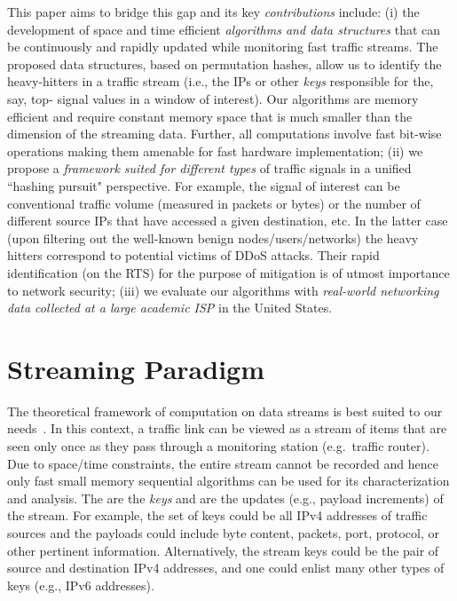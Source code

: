 \documentclass[10pt, conference, letterpaper,onecolumn]{IEEEtranv1.8}
\theoremstyle{plain}\newtheorem{thm}{Theorem}\newtheorem{lem}{Lemma}
\theoremstyle{definition}
\begin{document}
This paper aims to bridge this gap and its key {\em contributions} include:
(i) the  development of space and time efficient \emph{algorithms  and data structures} that can be continuously 
and rapidly updated while monitoring fast traffic streams. The proposed data structures, based on permutation hashes, allow us to identify the
heavy-hitters in a traffic stream (i.e., the IPs or other \emph{keys} responsible for the, say, top- signal values in a window of interest).
Our algorithms are
memory efficient and require constant memory space that is much smaller than the 
dimension of the streaming data. Further, all computations
involve fast bit-wise  operations making them amenable for fast hardware implementation;
(ii) we propose a \emph{framework  suited for different types} of traffic signals in a unified ``hashing pursuit" perspective. For example, the signal of interest can be 
conventional traffic volume (measured in packets or bytes) or the number of different source IPs  that have accessed a given destination, etc. In 
the latter case (upon filtering out the well-known benign nodes/users/networks) the heavy hitters correspond to potential victims of DDoS attacks. Their rapid
identification (on the RTS) for the purpose of mitigation is of utmost importance to network security; (iii) we evaluate our algorithms with
\emph{real-world networking data collected at a large academic ISP} in the United States.  
 
\section{Streaming Paradigm}
\label{sec:streaming}

The theoretical framework of computation on data streams is best suited to our needs~\cite{Muthukrishnan:2005:DSA:1166409.1166410}. In this context,
a traffic link can be viewed as a stream of items  that are seen only once
as they pass through a monitoring station (e.g.\ traffic router). Due to space/time constraints, the 
entire stream cannot be recorded and hence only fast small memory sequential algorithms can be used 
for its characterization and analysis. The  are the {\em keys} and  are the updates 
(e.g., payload increments) of the stream. For example, the set of keys  could be all IPv4 addresses of
traffic sources and the payloads could include byte content, packets, port, protocol,
or other pertinent information. Alternatively, the stream keys  could be the pair of
source and destination IPv4 addresses, and one could enlist many other types of keys (e.g., IPv6 addresses). 
\end{document}
